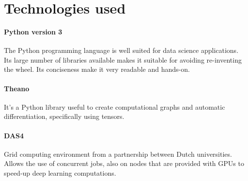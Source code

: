 \section{Technologies used}

\paragraph{Python version 3}
The Python programming language is well suited for data science applications. Its large
number of libraries available makes it suitable for avoiding re-inventing the wheel.
Its conciseness make it very readable and hands-on.

\paragraph{Theano} \cite{theano}
It's a Python library useful to create computational graphs and automatic differentiation,
specifically using tensors.

\paragraph{DAS4} \cite{das}
Grid computing environment from a partnership between Dutch universities. Allows the use
of concurrent jobs, also on nodes that are provided with GPUs to speed-up deep learning
computations.

